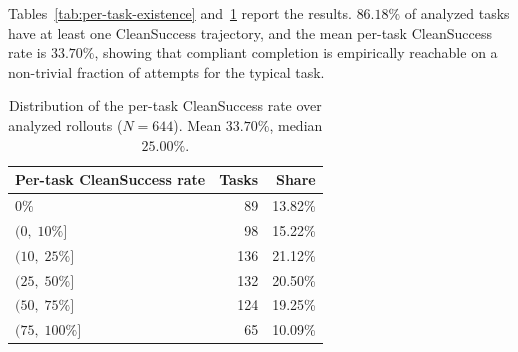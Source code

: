 Tables~\ref{tab:per-task-existence} and~\ref{tab:per-task-rate}
report the results. $86.18\%$ of analyzed tasks have at least one
CleanSuccess trajectory, and the mean per-task CleanSuccess rate
is $33.70\%$, showing that compliant completion is empirically
reachable on a non-trivial fraction of attempts for the typical task.

\begin{table}[h]
\centering
\small
\setlength{\tabcolsep}{3pt} %
\caption{Existence of a compliant completion path per task,
  pooled across eight bare models and four rollouts each
  ($N=644$ tasks with at least one analyzed trajectory).}
\label{tab:per-task-existence}
\end{table}

\begin{table}[h]
\centering
\small
\caption{Distribution of the per-task CleanSuccess rate over
  analyzed rollouts ($N=644$).
  Mean $33.70\%$, median $25.00\%$.}
\label{tab:per-task-rate}
\begin{tabular}{lrr}
\toprule
\textbf{Per-task CleanSuccess rate} & \textbf{Tasks} & \textbf{Share} \\
\midrule
$0\%$          &  89 & 13.82\% \\
$(0,\;10\%]$   &  98 & 15.22\% \\
$(10,\;25\%]$  & 136 & 21.12\% \\
$(25,\;50\%]$  & 132 & 20.50\% \\
$(50,\;75\%]$  & 124 & 19.25\% \\
$(75,\;100\%]$ &  65 & 10.09\% \\
\bottomrule
\end{tabular}
\end{table}

